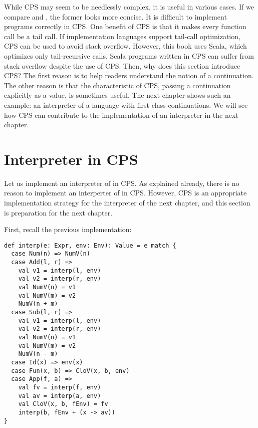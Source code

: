 
While CPS may seem to be needlessly complex, it is useful in various cases.
If we compare  and , the former looks more concise.
It is difficult to implement programs correctly in CPS. One benefit of CPS is
that it makes every function call be a tail call. If implementation languages
support tail-call optimization, CPS can be used to avoid stack overflow.
However, this book uses Scala, which optimizes only tail-recursive calls.
Scala programs written in CPS can suffer from stack overflow despite the use of
CPS. Then, why does this section introduce CPS? The first reason is to help
readers understand the notion of a continuation. The other reason is that
the characteristic of CPS, passing a continuation explicitly as a value, is
sometimes useful. The next chapter shows such an example: an interpreter of a
language with first-class continuations. We will see how CPS can
contribute to the implementation of an interpreter in the next chapter.

\section{Interpreter in CPS}

Let us implement an interpreter of \lang in CPS. As explained already, there is
no reason to implement an interperter of \lang in CPS. However, CPS is an appropriate
implementation strategy for the interpreter of the next chapter, and this
section is preparation for the next chapter.

First, recall the previous implementation:

\begin{verbatim}
def interp(e: Expr, env: Env): Value = e match {
  case Num(n) => NumV(n)
  case Add(l, r) =>
    val v1 = interp(l, env)
    val v2 = interp(r, env)
    val NumV(n) = v1
    val NumV(m) = v2
    NumV(n + m)
  case Sub(l, r) =>
    val v1 = interp(l, env)
    val v2 = interp(r, env)
    val NumV(n) = v1
    val NumV(m) = v2
    NumV(n - m)
  case Id(x) => env(x)
  case Fun(x, b) => CloV(x, b, env)
  case App(f, a) =>
    val fv = interp(f, env)
    val av = interp(a, env)
    val CloV(x, b, fEnv) = fv
    interp(b, fEnv + (x -> av))
}
\end{verbatim}

